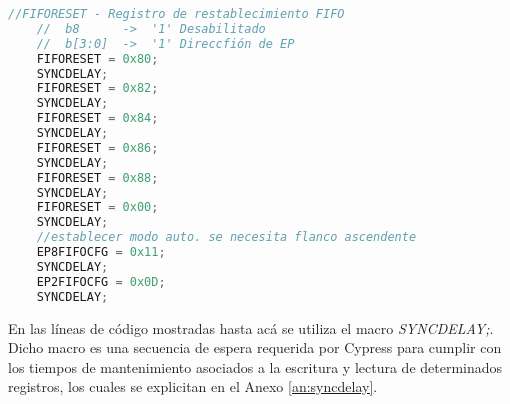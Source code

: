 	\begin{lstlisting}[language=C,backgroundcolor=\color{gray!30}]
	//FIFORESET - Registro de restablecimiento FIFO
	//	b8		->	'1' Desabilitado
	//	b[3:0]	->	'1' Direccfión de EP
	FIFORESET = 0x80;
	SYNCDELAY;
	FIFORESET = 0x82;
	SYNCDELAY;
	FIFORESET = 0x84;
	SYNCDELAY;
	FIFORESET = 0x86;
	SYNCDELAY;
	FIFORESET = 0x88;
	SYNCDELAY;
	FIFORESET = 0x00;
	SYNCDELAY;
	//establecer modo auto. se necesita flanco ascendente
	EP8FIFOCFG = 0x11;
	SYNCDELAY;
	EP2FIFOCFG = 0x0D;
	SYNCDELAY;
	\end{lstlisting}
	

	En las líneas de código mostradas hasta acá se utiliza el macro {\it SYNCDELAY;}. Dicho macro es una secuencia de espera requerida por Cypress para cumplir con los tiempos de mantenimiento asociados a la escritura y lectura de determinados registros\cite{CypressSemiconductor2014fx2lp}, los cuales se explicitan en el Anexo \ref{an:syncdelay}.
